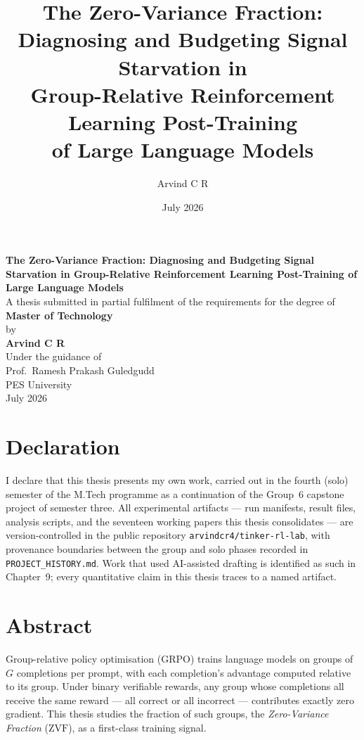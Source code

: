 \documentclass[12pt,a4paper,oneside]{report}
\title{The Zero-Variance Fraction:\\
Diagnosing and Budgeting Signal Starvation in\\
Group-Relative Reinforcement Learning Post-Training\\
of Large Language Models}
\author{Arvind C R}
\date{July 2026}
\newcommand{\ZVF}{\ensuremath{\mathrm{ZVF}}}
\begin{document}
\begin{titlepage}
\centering
{\Large \textbf{The Zero-Variance Fraction: Diagnosing and Budgeting Signal
Starvation in Group-Relative Reinforcement Learning Post-Training of Large
Language Models}}\\[2cm]
A thesis submitted in partial fulfilment of the requirements for the degree of\\[0.3cm]
{\large \textbf{Master of Technology}}\\[1.5cm]
by\\[0.3cm]
{\large \textbf{Arvind C R}}\\[1.5cm]
Under the guidance of\\[0.3cm]
{\large Prof.\ Ramesh Prakash Guledgudd}\\[2cm]
{\large PES University}\\[0.3cm]
July 2026
\end{titlepage}

\chapter*{Declaration}
I declare that this thesis presents my own work, carried out in the fourth
(solo) semester of the M.Tech programme as a continuation of the Group~6
capstone project of semester three. All experimental artifacts --- run
manifests, result files, analysis scripts, and the seventeen working papers
this thesis consolidates --- are version-controlled in the public repository
\texttt{arvindcr4/tinker-rl-lab}, with provenance boundaries between the group
and solo phases recorded in \texttt{PROJECT\_HISTORY.md}. Work that used
AI-assisted drafting is identified as such in Chapter~9; every quantitative
claim in this thesis traces to a named artifact.

\chapter*{Abstract}
Group-relative policy optimisation (GRPO) trains language models on groups of
$G$ completions per prompt, with each completion's advantage computed relative
to its group. Under binary verifiable rewards, any group whose completions all
receive the same reward --- all correct or all incorrect --- contributes
exactly zero gradient. This thesis studies the fraction of such groups, the
\emph{Zero-Variance Fraction} (\ZVF{}), as a first-class training signal.
\end{document}

